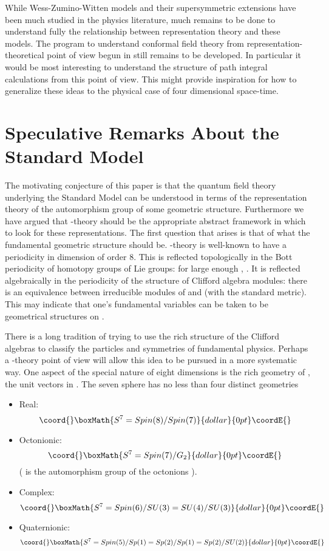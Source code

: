 \documentclass[a4paper,a4paper]{article}
\theoremstyle{conjecture}
\begin{document}
While Wess-Zumino-Witten models and their supersymmetric extensions have been much studied in the physics
literature, much remains to be done to understand fully the relationship between representation theory
and these models.  The program to understand conformal field theory from representation-theoretical point of
view begun in \cite{Segal1} still remains to be developed. In particular it would be most interesting to
understand the structure of path integral calculations from this point of view.  This might provide
inspiration for how to generalize these ideas to the physical case of four dimensional space-time.


\section{Speculative Remarks About the Standard Model}

The motivating conjecture of this paper is that the quantum field theory underlying the Standard Model
can be understood in terms of the representation theory of the automorphism group of some geometric
structure. Furthermore we have argued that \coordHE{}-theory should be the appropriate abstract framework in
which to look for these representations.  The first question that arises is that of what the fundamental
geometric structure should be.  \coordHE{}-theory is well-known to have a periodicity in dimension of order 8.  
This is reflected topologically in the Bott periodicity of homotopy groups of Lie groups: for large
enough \coordHE{}, \coordHE{}. It is reflected algebraically in the periodicity of the
structure of Clifford algebra modules: there is an equivalence between irreducible modules of \coordHE{} and \coordHE{} (with the standard metric).  This may indicate that one's fundamental
variables can be taken to be geometrical structures on \coordHE{}.

There is a long tradition of trying to use the rich structure of the Clifford algebras to
classify the particles and symmetries of fundamental physics. Perhaps a \coordHE{}-theory point
of view will allow this idea to be pursued in a more systematic way.  One aspect of the
special nature of eight dimensions is the rich geometry of \coordHE{}, the unit vectors in \coordHE{}.
The seven sphere has no less than four distinct geometries
\begin{itemize}
\item
Real:
$$\coord{}\boxMath{S^7=Spin(8)/Spin(7)}{dollar}{0pt}\coordE{}$$
\item
Octonionic:
$$\coord{}\boxMath{S^7=Spin(7)/G_2}{dollar}{0pt}\coordE{}$$
(\coordHE{} is the automorphism group of the octonions \coordHE{}).
\item
Complex:
$$\coord{}\boxMath{S^7=Spin(6)/SU(3)=SU(4)/SU(3)}{dollar}{0pt}\coordE{}$$
\item
Quaternionic:
$$\coord{}\boxMath{S^7=Spin(5)/Sp(1)=Sp(2)/Sp(1)=Sp(2)/SU(2)}{dollar}{0pt}\coordE{}$$
\end{itemize}
\end{document}
